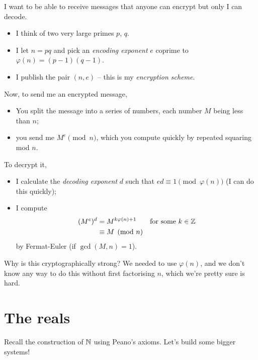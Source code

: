 \documentclass{../template/note}
\begin{document}
    \begin{algorithm}[RSA]
        I want to be able to receive messages that anyone can encrypt but only I can decode.
        \begin{itemize}
            \item I think of two very large primes \(p\), \(q\).
            \item I let \(n = pq\) and pick an \emph{encoding exponent} \(e\) coprime to \(\varphi(n) = (p-1)(q-1)\).
            \item I publish the pair \((n, e)\) -- this is my \emph{encryption scheme}.
        \end{itemize}
        Now, to send me an encrypted message,
        \begin{itemize}
            \item You split the message into a series of numbers, each number \(M\) being less than \(n\);
            \item you send me \(M^e \pmod n\), which you compute quickly by repeated squaring mod \(n\).
        \end{itemize}
        To decrypt it,
        \begin{itemize}
            \item I calculate the \emph{decoding exponent} \(d\) such that \(ed \equiv 1 \pmod{\varphi(n)}\) (I can do this quickly);
            \item I compute
            \begin{align*}
                (M^e)^d &= M^{k \varphi(n) + 1} && \text{for some }k \in \mathbb Z\\
                &\equiv M \pmod n
            \end{align*}
            by Fermat-Euler (if \(\gcd(M, n) = 1\)).
        \end{itemize}
        Why is this cryptographically strong? We needed to use \(\varphi(n)\), and we don't know any way to do this without first factorising \(n\), which we're pretty sure is hard.    
    \end{algorithm}
    
    \section{The reals}
    
    Recall the construction of \(\mathbb N\) using Peano's axioms. Let's build some bigger systems!
\end{document}
